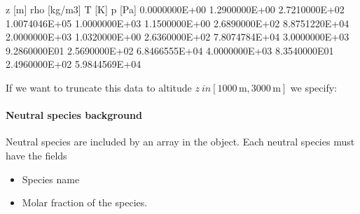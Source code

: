\documentclass[letterpaper,10pt,english]{sphinxmanual}
\begin{document}
\begin{sphinxVerbatim}[commandchars=\\\{\},formatcom=\scriptsize]
\PYGZsh{} z [m]              rho [kg/m\PYGZca{}3]    T [K]           p [Pa]
0.0000000E+00        1.2900000E+00   2.7210000E+02   1.0074046E+05
1.0000000E+03        1.1500000E+00   2.6890000E+02   8.8751220E+04
2.0000000E+03        1.0320000E+00   2.6360000E+02   7.8074784E+04
3.0000000E+03        9.2860000E\PYGZhy{}01   2.5690000E+02   6.8466555E+04
4.0000000E+03        8.3540000E\PYGZhy{}01   2.4960000E+02   5.9844569E+04
\end{sphinxVerbatim}

If we want to truncate this data to altitude \(z \ in[1000\,\textrm{m}, 3000\,\textrm{m}]\) we specify:

\begin{sphinxVerbatim}[commandchars=\\\{\},formatcom=\scriptsize]
     
     
     
     
     
     
     
     
     
     
\end{sphinxVerbatim}


\paragraph{Neutral species background}
\label{\detokenize{Applications/CdrPlasmaModel:neutral-species-background}}
Neutral species are included by an array  in the  object.
Each neutral species must have the fields
\begin{itemize}
\item {} 
 Species name

\item {} 
 Molar fraction of the species.

\end{itemize}
\end{document}
